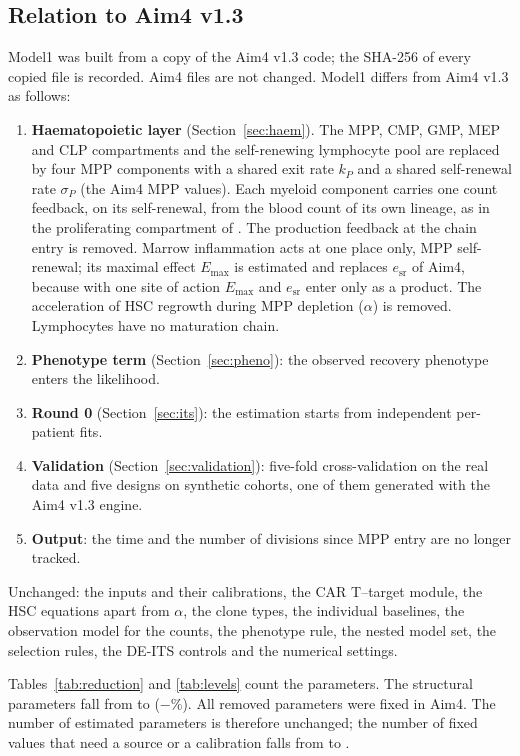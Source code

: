 \documentclass[11pt]{article}
\begin{document}
\subsection{Relation to Aim4 v1.3}\label{sec:changes}
Model1 was built from a copy of the Aim4 v1.3 code; the SHA-256 of every copied file is recorded. Aim4 files are not changed. Model1 differs from Aim4 v1.3 as follows:
\begin{enumerate}
\item \textbf{Haematopoietic layer} (Section~\ref{sec:haem}). The MPP, CMP, GMP, MEP and CLP compartments and the self-renewing lymphocyte pool are replaced by four MPP components with a shared exit rate $k_P$ and a shared self-renewal rate $\sigma_P$ (the Aim4 MPP values). Each myeloid component carries one count feedback, on its self-renewal, from the blood count of its own lineage, as in the proliferating compartment of \citet{friberg2002}. The production feedback at the chain entry is removed. Marrow inflammation acts at one place only, MPP self-renewal; its maximal effect $E_{\max}$ is estimated and replaces $e_{\mathrm{sr}}$ of Aim4, because with one site of action $E_{\max}$ and $e_{\mathrm{sr}}$ enter only as a product. The acceleration of HSC regrowth during MPP depletion ($\alpha$) is removed. Lymphocytes have no maturation chain.
\item \textbf{Phenotype term} (Section~\ref{sec:pheno}): the observed recovery phenotype enters the likelihood.
\item \textbf{Round 0} (Section~\ref{sec:its}): the estimation starts from independent per-patient fits.
\item \textbf{Validation} (Section~\ref{sec:validation}): five-fold cross-validation on the real data and five designs on synthetic cohorts, one of them generated with the Aim4 v1.3 engine.
\item \textbf{Output}: the time and the number of divisions since MPP entry are no longer tracked.
\end{enumerate}
Unchanged: the inputs and their calibrations, the CAR T--target module, the HSC equations apart from $\alpha$, the clone types, the individual baselines, the observation model for the counts, the phenotype rule, the nested model set, the selection rules, the DE-ITS controls and the numerical settings.

Tables~\ref{tab:reduction} and \ref{tab:levels} count the parameters. The structural parameters fall from \valNStructAimFour{} to \valNStruct{} ($-$\valReductionPct\%). All removed parameters were fixed in Aim4. The number of estimated parameters is therefore unchanged; the number of fixed values that need a source or a calibration falls from \valNFixedAimFour{} to \valNFixed.
\end{document}
